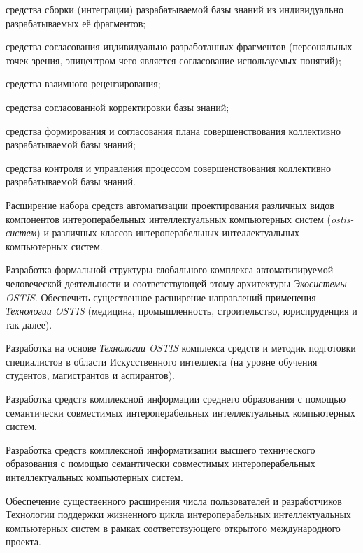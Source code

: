 \begin{textitemize}
	\begin{textitemize}
		\item средства сборки (интеграции) разрабатываемой базы знаний из индивидуально разрабатываемых её фрагментов;
		\item средства согласования индивидуально разработанных фрагментов (персональных точек зрения, эпицентром чего является согласование используемых понятий);
		\item средства взаимного рецензирования;
		\item средства согласованной корректировки базы знаний;
		\item средства формирования и согласования плана совершенствования коллективно разрабатываемой базы знаний;
		\item средства контроля и управления процессом совершенствования коллективно разрабатываемой базы знаний.
	\end{textitemize}
	\item Расширение набора средств автоматизации проектирования различных видов компонентов интероперабельных интеллектуальных компьютерных систем (\textit{ostis-систем}) и различных классов интероперабельных интеллектуальных компьютерных систем.
	\medskip
	\item Разработка формальной структуры глобального комплекса автоматизируемой человеческой деятельности и соответствующей этому архитектуры \textit{Экосистемы OSTIS}. Обеспечить существенное расширение направлений применения \textit{Технологии OSTIS} (медицина, промышленность, строительство, юриспруденция и так далее).
	\medskip
	\item Разработка на основе \textit{Технологии OSTIS} комплекса средств и методик подготовки специалистов в области Искусственного интеллекта (на уровне обучения студентов, магистрантов и аспирантов).
	\medskip
	\item Разработка средств комплексной информации среднего образования с помощью семантически совместимых интероперабельных интеллектуальных компьютерных систем.
	\medskip
	\item Разработка средств комплексной информатизации высшего технического образования с помощью семантически совместимых интероперабельных интеллектуальных компьютерных систем.
	\medskip
	\item Обеспечение существенного расширения числа пользователей и разработчиков Технологии поддержки жизненного цикла интероперабельных интеллектуальных компьютерных систем в рамках соответствующего открытого международного проекта.
\end{textitemize}